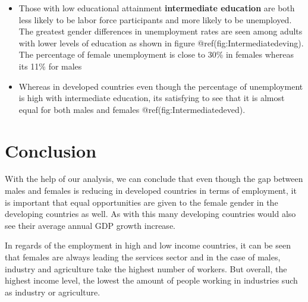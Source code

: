\documentclass[
]{article}
\begin{document}
\begin{itemize}
\item
  Those with low educational attainment \textbf{intermediate education}
  are both less likely to be labor force participants and more likely to
  be unemployed. The greatest gender differences in unemployment rates
  are seen among adults with lower levels of education as shown in
  figure @ref(fig:Intermediatedeving). The percentage of female
  unemployment is close to 30\% in females whereas its 11\% for males
\item
  Whereas in developed countries even though the percentage of
  unemployment is high with intermediate education, its satisfying to
  see that it is almost equal for both males and females
  @ref(fig:Intermediatedeved). \autocite{education}
\end{itemize}

\clearpage

\hypertarget{conclusion}{%
\section{Conclusion}\label{conclusion}}

With the help of our analysis, we can conclude that even though the gap
between males and females is reducing in developed countries in terms of
employment, it is important that equal opportunities are given to the
female gender in the developing countries as well. As with this many
developing countries would also see their average annual GDP growth
increase.

In regards of the employment in high and low income countries, it can be
seen that females are always leading the services sector and in the case
of males, industry and agriculture take the highest number of workers.
But overall, the highest income level, the lowest the amount of people
working in industries such as industry or agriculture.

\clearpage

\printbibliography
\end{document}
